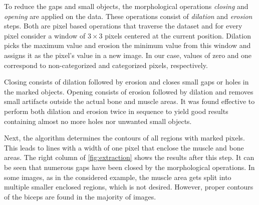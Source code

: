To reduce the gaps and small objects, the morphological operations \emph{closing} and \emph{opening} are applied on the data. These operations consist of \emph{dilation} and \emph{erosion} steps. Both are pixel based operations that traverse the dataset and for every pixel consider a window of $3\times 3$ pixels centered at the current position. Dilation picks the maximum value and erosion the minimum value from this window and assigns it as the pixel's value in a new image. In our case, values of zero and one correspond to non-categorized and categorized pixels, respectively.

Closing consists of dilation followed by erosion and closes small gaps or holes in the marked objects. Opening consists of erosion followed by dilation and removes small artifacts outside the actual bone and muscle areas. It was found effective to perform both dilation and erosion twice in sequence to yield good results containing almost no more holes nor unwanted small objects.

Next, the algorithm determines the contours of all regions with marked pixels. This leads to lines with a width of one pixel that enclose the muscle and bone areas. The right column of \cref{fig:extraction} shows the results after this step. It can be seen that numerous gaps have been closed by the morphological operations. In some images, as in the considered example, the muscle area gets split into multiple smaller enclosed regions, which is not desired. However, proper contours of the biceps are found in the majority of images. 

